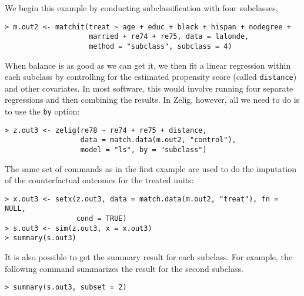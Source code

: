 \begin{description}
  We begin this example by conducting subclassification with four
  subclasses,
\begin{verbatim}
> m.out2 <- matchit(treat ~ age + educ + black + hispan + nodegree + 
                    married + re74 + re75, data = lalonde, 
                    method = "subclass", subclass = 4)
\end{verbatim}
  When balance is as good as we can get it, we then fit a linear
  regression within each subclass by controlling for the estimated
  propensity score (called \texttt{distance}) and other covariates.
  In most software, this would involve running four separate
  regressions and then combining the results.  In Zelig, however, all
  we need to do is to use the {\tt by} option:
\begin{verbatim}
> z.out3 <- zelig(re78 ~ re74 + re75 + distance, 
                  data = match.data(m.out2, "control"), 
                  model = "ls", by = "subclass")
\end{verbatim}
  The same set of commands as in the first example are used to do the
  imputation of the counterfactual outcomes for the treated units:
\begin{verbatim}
> x.out3 <- setx(z.out3, data = match.data(m.out2, "treat"), fn = NULL, 
                 cond = TRUE)
> s.out3 <- sim(z.out3, x = x.out3)
> summary(s.out3)
\end{verbatim}
It is also possible to get the summary result for each subclass. For
example, the following command summarizes the result for the second
subclass.
\begin{verbatim}
> summary(s.out3, subset = 2)
\end{verbatim}
  
\end{description}


